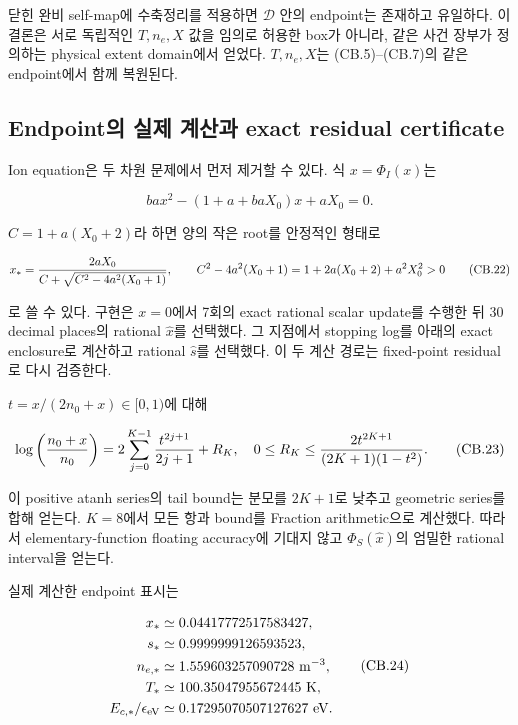 닫힌 완비 self-map에 수축정리를 적용하면 \(\mathcal D\) 안의 endpoint는 존재하고 유일하다. 이 결론은 서로 독립적인 \(T,n_e,X\) 값을 임의로 허용한 box가 아니라, 같은 사건 장부가 정의하는 physical extent domain에서 얻었다. \(T,n_e,X\)는 (CB.5)--(CB.7)의 같은 endpoint에서 함께 복원된다.

\hypertarget{endpointuxc758-uxc2e4uxc81c-uxacc4uxc0b0uxacfc-exact-residual-certificate}{%
\subsection{Endpoint의 실제 계산과 exact residual certificate}\label{endpointuxc758-uxc2e4uxc81c-uxacc4uxc0b0uxacfc-exact-residual-certificate}}

Ion equation은 두 차원 문제에서 먼저 제거할 수 있다. 식 \(x=\Phi_I(x)\)는

\[
 ba x^2-(1+a+baX_0)x+aX_0=0.
 \tag{CB.21}
\]

\(C=1+a(X_0+2)\)라 하면 양의 작은 root를 안정적인 형태로

\[
 x_*={2aX_0\over C+\sqrt{C^2-4a^2(X_0+1)}},\qquad
 C^2-4a^2(X_0+1)=1+2a(X_0+2)+a^2X_0^2>0
 \tag{CB.22}
\]

로 쓸 수 있다. 구현은 \(x=0\)에서 7회의 exact rational scalar update를 수행한 뒤 30 decimal places의 rational \(\widehat x\)를 선택했다. 그 지점에서 stopping log를 아래의 exact enclosure로 계산하고 rational \(\widehat s\)를 선택했다. 이 두 계산 경로는 fixed-point residual로 다시 검증한다.

\(t=x/(2n_0+x)\in[0,1)\)에 대해

\[
 \log\left({n_0+x\over n_0}\right)
 =2\sum_{j=0}^{K-1}{t^{2j+1}\over2j+1}+R_K,
 \quad
 0\le R_K\le{2t^{2K+1}\over(2K+1)(1-t^2)}.
 \tag{CB.23}
\]

이 positive atanh series의 tail bound는 분모를 \(2K+1\)로 낮추고 geometric series를 합해 얻는다. \(K=8\)에서 모든 항과 bound를 Fraction arithmetic으로 계산했다. 따라서 elementary-function floating accuracy에 기대지 않고 \(\Phi_S(\widehat x)\)의 엄밀한 rational interval을 얻는다.

실제 계산한 endpoint 표시는

\[
 \begin{aligned}
 x_*&\simeq0.04417772517583427,\\
 s_*&\simeq0.9999999126593523,\\
 n_{e,*}&\simeq1.559603257090728\ {\rm m^{-3}},\\
 T_*&\simeq100.35047955672445\ {\rm K},\\
 E_{c,*}/\epsilon_{\rm eV}&\simeq0.17295070507127627\ {\rm eV}.
 \end{aligned}\tag{CB.24}
\]

